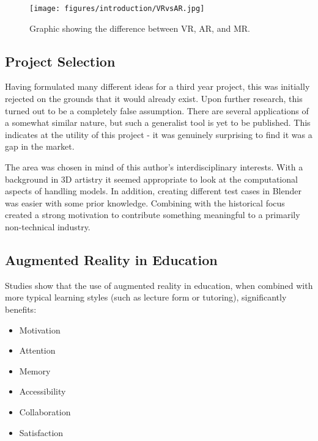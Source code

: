 \documentclass[12pt, a4paper]{article}
\begin{document}
\begin{figure}[H]
    \centering
    \texttt{[image: figures/introduction/VRvsAR.jpg]}
    \caption{Graphic showing the difference between VR, AR, and MR. \cite{originality:arvrmr}}
    \label{fig:VRvsAR}
\end{figure}

\newpage
\subsection{Project Selection}
Having formulated many different ideas for a third year project, this was initially rejected on the grounds that it would already exist. Upon further research, this turned out to be a completely false assumption. There are several applications of a somewhat similar nature, but such a generalist tool is yet to be published. This indicates at the utility of this project - it was genuinely surprising to find it was a gap in the market.

The area was chosen in mind of this author's interdisciplinary interests. With a background in 3D artistry it seemed appropriate to look at the computational aspects of handling models. In addition, creating different test cases in Blender was easier with some prior knowledge. Combining with the historical focus created a strong motivation to contribute something meaningful to a primarily non-technical industry.

\subsection{Augmented Reality in Education}
Studies show that the use of augmented reality in education, when combined with more typical learning styles (such as lecture form or tutoring), significantly benefits: \cite{education:ARlit}

\begin{multicols}{2}
    \begin{itemize}
    \item Motivation
    \item Attention
    \item Memory
    \item Accessibility
    \item Collaboration
    \item Satisfaction
    \end{itemize}
\end{multicols}
\end{document}
